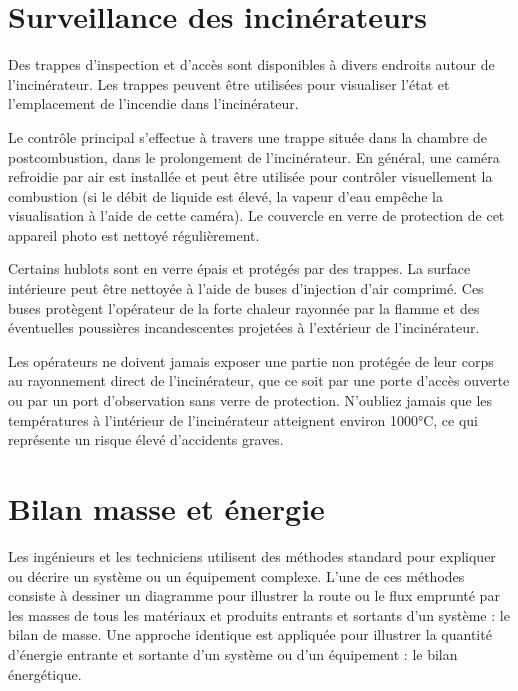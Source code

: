 \section{Surveillance des incinérateurs} 

Des trappes d'inspection et d'accès sont disponibles à divers endroits autour de l'incinérateur.
Les trappes peuvent être utilisées pour visualiser l'état et l'emplacement de l'incendie dans l'incinérateur. 

\vspace{0.3cm}

Le contrôle principal s'effectue à travers une trappe située dans la chambre de postcombustion, dans le prolongement de l'incinérateur. En général, une caméra refroidie par air est installée et peut être utilisée pour contrôler visuellement la combustion (si le débit de liquide est élevé, la vapeur d'eau empêche la visualisation à l'aide de cette caméra). Le couvercle en verre de protection de cet appareil photo est nettoyé régulièrement.
\vspace{0.3cm}

Certains hublots sont en verre épais et protégés par des trappes. La surface intérieure peut être nettoyée à l'aide de buses d'injection d'air comprimé. Ces buses protègent l'opérateur de la forte chaleur rayonnée par la flamme et des éventuelles poussières incandescentes projetées à l'extérieur de l'incinérateur.

\vspace{0.3cm}

Les opérateurs ne doivent jamais exposer une partie non protégée de leur corps au rayonnement direct de l'incinérateur, que ce soit par une porte d'accès ouverte ou par un port d'observation sans verre de protection.
N'oubliez jamais que les températures à l'intérieur de l'incinérateur atteignent environ 1000°C, ce qui représente un risque élevé d'accidents graves.



\section{\textbf{Bilan masse et énergie}}

Les ingénieurs et les techniciens utilisent des méthodes standard pour expliquer ou décrire un système ou un équipement complexe. L'une de ces méthodes consiste à dessiner un diagramme pour illustrer la route ou le flux emprunté par les masses de tous les matériaux et produits entrants et sortants d'un système : le bilan de masse. Une approche identique est appliquée pour illustrer la quantité d'énergie entrante et sortante d'un système ou d'un équipement : le bilan énergétique.


